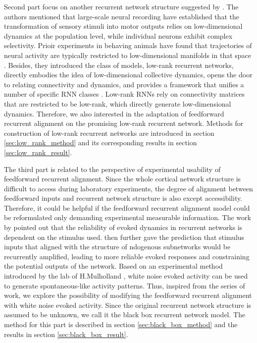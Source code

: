 \documentclass[11pt]{article}
\begin{document}
	Second part focus on another recurrent network structure suggested by \cite{dubreuil2022role, beiran2021shaping, mastrogiuseppe2018linking}. The authors mentioned that large-scale neural recording have established that the transformation of sensory stimuli into motor outputs relies on low-dimensional dynamics at the population level, while individual neurons exhibit complex selectivity. Prioir experiments in behaving animals  have found that trajectories of neural activity are typically restricted to low-dimensional manifolds in that space \cite{machens2010functional, mante2013context,  rigotti2013importance, gao2015simplicity, gallego2018cortical,  chaisangmongkon2017computing,  wang2018flexible,  sohn2019bayesian}.
	Besides, they introduced the class of models, low-rank recurrent networks, directly embodies the idea of low-dimensional collective dynamics, opens the door to relating connectivity and dynamics, and provides a framework that unifies a number of specific RNN classes \cite{mastrogiuseppe2018linking}. Low-rank RNNs rely on connectivity matrices that are restricted to be low-rank, which directly generate low-dimensional dynamics. 
	Therefore, we also interested in the adaptation of feedforward recurrent alignment on the promising low-rank recurrent network. Methods for construction of low-rank recurrent networks are introduced in section \ref{sec:low_rank_method} and its corresponding results in section \ref{sec:low_rank_result}. 
	
	The third part is related to the perspective of experimental usability of feedforward recurrent alignment. Since the whole cortical network structure is difficult to access during laboratory experiments, the degree of alignment between feedforward inputs and recurrent network structure is also except accessibility. Therefore, it could be helpful if the feedforward recurrent alignment model could be reformulated only demanding experimental measurable information. The work by \cite{marre2009reliable} pointed out that the reliability of evoked dynamics in recurrent networks is dependent on the stimulus used. \cite{mulholland2023selective} then further gave the prediction that stimulus inputs that aligned with the structure of ndogenous subnetworks would be recurrently amplified, leading to more reliable evoked responses and constraining the potential outputs of the network. Based on an experimental method introduced by the lab of H.Mulholland \cite{cosyne2023}, white noise evoked activity can be used to generate spontaneous-like activity patterns. Thus, inspired from the series of work, we explore the possibility of modifying the feedforward recurrent alignment with white noise evoked activity. Since the original recurrent network structure is assumed to be unknown, we call it the black box recurrent network model. The method for this part is described in section \ref{sec:black_box_method} and the results in section \ref{sec:black_box_result}. 
	
\end{document}
